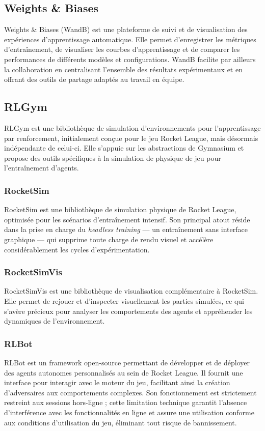 \subsection{Weights \& Biases}
\label{sec:wandb}
Weights \& Biases (WandB) est une plateforme de suivi et de visualisation des expériences d'apprentissage automatique. Elle permet d'enregistrer les métriques d'entraînement, de visualiser les courbes d'apprentissage et de comparer les performances de différents modèles et configurations. WandB facilite par ailleurs la collaboration en centralisant l'ensemble des résultats expérimentaux et en offrant des outils de partage adaptés au travail en équipe. \parencite{WeightsBiasesAI}

\subsection{RLGym}
RLGym est une bibliothèque de simulation d'environnements pour l'apprentissage par renforcement, initialement conçue pour le jeu Rocket League, mais désormais indépendante de celui-ci. Elle s'appuie sur les abstractions de Gymnasium et propose des outils spécifiques à la simulation de physique de jeu pour l'entraînement d'agents. \parencite{RLGymRlgym2026}

\subsubsection{RocketSim}
\label{sec:rocketsim}
RocketSim est une bibliothèque de simulation physique de Rocket League, optimisée pour les scénarios d'entraînement intensif. Son principal atout réside dans la prise en charge du \textit{headless training} — un entraînement sans interface graphique — qui supprime toute charge de rendu visuel et accélère considérablement les cycles d'expérimentation. \parencite{zealanlZealanLRocketSim2026}

\subsubsection{RocketSimVis}
\label{sec:rocketsimvis}
RocketSimVis est une bibliothèque de visualisation complémentaire à RocketSim. Elle permet de rejouer et d'inspecter visuellement les parties simulées, ce qui s'avère précieux pour analyser les comportements des agents et appréhender les dynamiques de l'environnement. \parencite{zealanlZealanLRocketSimVis2026}

\subsubsection{RLBot}
\label{sec:rlbot}
RLBot est un framework open-source permettant de développer et de déployer des agents autonomes personnalisés au sein de Rocket League. Il fournit une interface pour interagir avec le moteur du jeu, facilitant ainsi la création d'adversaires aux comportements complexes. Son fonctionnement est strictement restreint aux sessions hors-ligne ; cette limitation technique garantit l'absence d'interférence avec les fonctionnalités en ligne et assure une utilisation conforme aux conditions d'utilisation du jeu, éliminant tout risque de bannissement. \parencite{RLBot2018}


